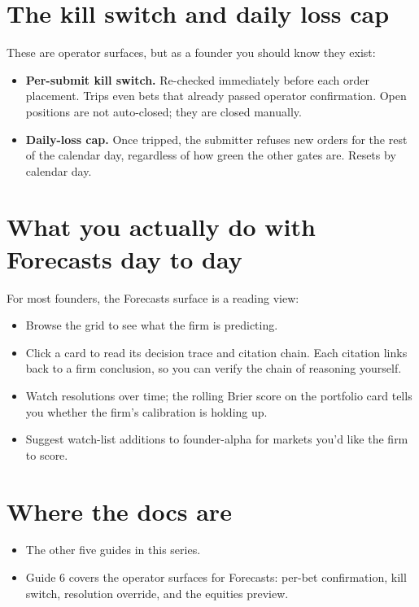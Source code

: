 \documentclass[11pt]{article}
\begin{document}
\section{The kill switch and daily loss cap}

These are operator surfaces, but as a founder you should know they
exist:

\begin{itemize}[leftmargin=*,itemsep=0.2em]
  \item \textbf{Per-submit kill switch.} Re-checked immediately before
        each order placement. Trips even bets that already passed
        operator confirmation. Open positions are not auto-closed;
        they are closed manually.
  \item \textbf{Daily-loss cap.} Once tripped, the submitter refuses
        new orders for the rest of the calendar day, regardless of
        how green the other gates are. Resets by calendar day.
\end{itemize}

\section{What you actually do with Forecasts day to day}

For most founders, the Forecasts surface is a reading view:

\begin{itemize}[leftmargin=*,itemsep=0.2em]
  \item Browse the grid to see what the firm is predicting.
  \item Click a card to read its decision trace and citation chain.
        Each citation links back to a firm conclusion, so you can
        verify the chain of reasoning yourself.
  \item Watch resolutions over time; the rolling Brier score on the
        portfolio card tells you whether the firm's calibration is
        holding up.
  \item Suggest watch-list additions to founder-alpha for markets
        you'd like the firm to score.
\end{itemize}

\section{Where the docs are}

\begin{itemize}[leftmargin=*,itemsep=0.2em]
  \item The other five guides in this series.
  \item Guide 6 covers the operator surfaces for Forecasts: per-bet
        confirmation, kill switch, resolution override, and the
        equities preview.
\end{itemize}
\end{document}
